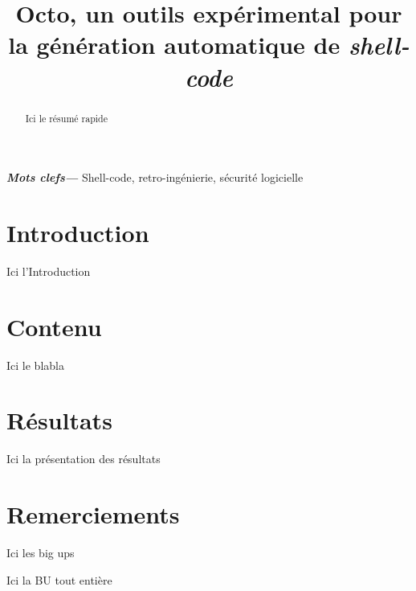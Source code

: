 \documentclass{article}
\title{Octo, un outils expérimental pour la génération automatique de \textit{shell-code}}
\begin{document}
\maketitle

\begin{abstract}
  Ici le résumé rapide
\end{abstract} \hspace{10pt}

\textbf{\textit{Mots clefs---}} Shell-code, retro-ingénierie, sécurité logicielle

\section*{Introduction}
Ici l'Introduction

\section*{Contenu}
Ici le blabla

\section*{Résultats}
Ici la présentation des résultats

\section*{Remerciements}
Ici les big ups


\begin{thebibliography}{00}
  Ici la BU tout entière
\end{thebibliography}
\end{document}
